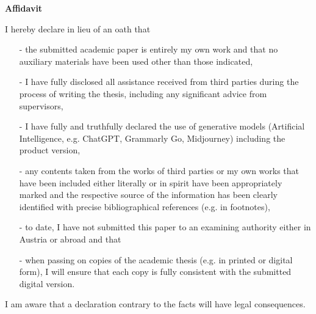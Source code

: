 {\Large
\noindent
{\bf Affidavit}} \\
\vspace*{0.3 cm}

\noindent
I hereby declare in lieu of an oath that
\begin{itemize}
    \item[-] the submitted academic paper is entirely my own work and that no auxiliary materials have been used other than those indicated,
    \item[-] I have fully disclosed all assistance received from third parties during the process of writing the thesis, including any significant advice from supervisors,
    \item[-] I have fully and truthfully declared the use of generative models (Artificial Intelligence, e.g. ChatGPT, Grammarly Go, Midjourney) including the product version,
    \item[-] any contents taken from the works of third parties or my own works that have been included either literally or in spirit have been appropriately marked and the respective source of the information has been clearly identified with precise bibliographical references (e.g. in footnotes),
    \item[-] to date, I have not submitted this paper to an examining authority either in Austria or abroad and that
    \item[-] when passing on copies of the academic thesis (e.g. in printed or digital form), I will ensure that each copy is fully consistent with the submitted digital version.
\end{itemize}

\noindent
I am aware that a declaration contrary to the facts will have legal consequences.\\\\\\\\

\noindent
\begin{table}[H]
\end{table}
